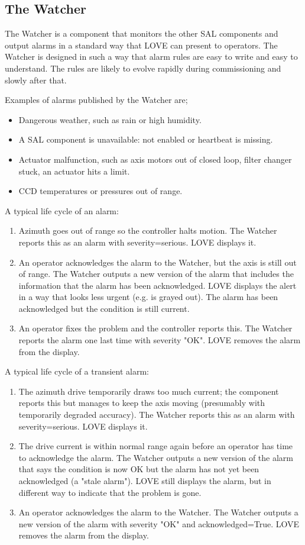 \subsection{The Watcher}\label{sect:watcher}
The Watcher is a component that monitors the other SAL components and output alarms in a standard way that LOVE can present 
to operators. The Watcher is designed in such a way that alarm rules are easy to write and easy to understand. The rules are likely 
to evolve rapidly during commissioning and slowly after that.

Examples of alarms published by the Watcher are;
%
\begin{itemize}
\item Dangerous weather, such as rain or high humidity.
\item A SAL component is unavailable: not enabled or heartbeat is missing.
\item Actuator malfunction, such as axis motors out of closed loop, filter changer stuck, an actuator hits a limit.
\item CCD temperatures or pressures out of range.
\end{itemize}

A typical life cycle of an alarm:
\begin{enumerate}
\item Azimuth goes out of range so the controller halts motion. The Watcher reports this as an alarm with severity=serious. LOVE 
displays it.
\item An operator acknowledges the alarm to the Watcher, but the axis is still out of range. The Watcher outputs a new version of the 
alarm that includes the information that the alarm has been acknowledged. LOVE displays the alert in a way that looks less urgent 
(e.g. is grayed out). The alarm has been acknowledged but the condition is still current.
\item An operator fixes the problem and the controller reports this. The Watcher reports the alarm one last time with severity "OK". 
LOVE removes the alarm from the display.
\end{enumerate}

A typical life cycle of a transient alarm:
\begin{enumerate}
\item The azimuth drive temporarily draws too much current; the component reports this but manages to keep the axis moving 
(presumably with temporarily degraded accuracy). The Watcher reports this as an alarm with severity=serious. LOVE displays it.
\item The drive current is within normal range again before an operator has time to acknowledge the alarm. The Watcher outputs a 
new version of the alarm that says the condition is now OK but the alarm has not yet been acknowledged (a "stale alarm"). LOVE 
still displays the alarm, but in different way to indicate that the problem is gone.
\item An operator acknowledges the alarm to the Watcher. The Watcher outputs a new version of the alarm with severity "OK" 
and acknowledged=True. LOVE removes the alarm from the display.
\end{enumerate}

